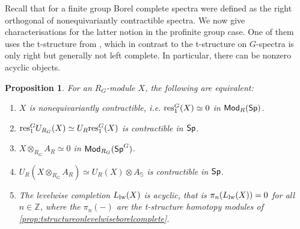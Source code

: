 \documentclass[reqno]{amsart}
\numberwithin{equation}{section}\theoremstyle{thms}
\newtheorem{prop}[equation]{Proposition}
\theoremstyle{defn}
\newcommand{\bS}{\mathbb{S}}
\newcommand{\bZ}{\mathbb{Z}}
\newcommand{\tn}[1]{\textnormal{#1}}
\newcommand{\tsf}[1]{\textsf{\textup{#1}}}
\newcommand{\Mod}{\tsf{Mod}}
\newcommand{\spec}{\tsf{Sp}}
\newcommand{\specg}{\tsf{Sp}^G}
\begin{document}
Recall that for a finite group Borel complete spectra were defined as the right orthogonal of nonequivariantly contractible spectra. We now give characterisations for the latter notion in the profinite group case. One of them uses the t-structure from , which in contrast to the t-structure on $G$-spectra is only right but generally not left complete. In particular, there can be nonzero acyclic objects.

\begin{prop}\label{prop:noneqcontractibleprofinite}
For an $R_G$-module $X$, the following are equivalent:
\begin{enumerate}
    \item $X$ is nonequivariantly contractible, i.e. $\tn{res}^G_1(X) \simeq 0$ in $\Mod_R(\spec)$.
    \item $\tn{res}^G_1U_{R_G}(X) \simeq U_R\tn{res}^G_1(X)$ is contractible in $\spec$.
    \item $X \otimes_{R_G} A_R \simeq 0$ in $\Mod_{R_G}(\specg)$.
    \item $U_R(X \otimes_{R_G} A_R) \simeq U_R(X) \otimes A_{\bS}$ is contractible in $\spec$.
    \item The levelwise completion $L_{\tn{lw}}(X)$ is acyclic, that is $\pi_n(L_{\tn{lw}}(X))=0$ for all $n \in \bZ$, where the $\pi_n(-)$ are the t-structure homotopy modules of \ref{prop:tstructureonlevelwiseborelcomplete}.
\end{enumerate}
\end{prop}
\end{document}
